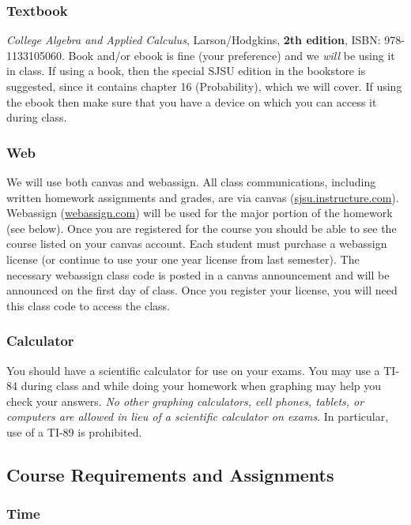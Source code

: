 \documentclass[letterpaper,12pt,fleqn]{article}
\begin{document}
\subsubsection*{Textbook}

\emph{College Algebra and Applied Calculus}, Larson/Hodgkins, \textbf{2th edition}, ISBN: 978-1133105060. Book
and/or ebook is fine (your preference) and we \emph{will} be using it in class.  If using a book, then the special
SJSU edition in the bookstore is suggested, since it contains chapter 16 (Probability), which we will cover.  If
using the ebook then make sure that you have a device on which you can access it during class.

\subsubsection*{Web}

We will use both canvas and webassign. All class communications, including written homework assignments and grades,
are via canvas (\url{sjsu.instructure.com}).  Webassign (\url{webassign.com}) will be used for the major portion of
the homework (see below).  Once you are registered for the course you should be able to see the course listed on
your canvas account.  Each student must purchase a webassign license (or continue to use your one year license from
last semester). The necessary webassign class code is posted in a canvas announcement and will be announced on the
first day of class. Once you register your license, you will need this class code to access the class.

\subsubsection*{Calculator}

You should have a scientific calculator for use on your exams.  You may use a TI-84 during class and while doing
your homework when graphing may help you check your answers.  \emph{No other graphing calculators, cell phones,
  tablets, or computers are allowed in lieu of a scientific calculator on exams}.  In particular, use of a TI-89 is
prohibited.

\subsection*{Course Requirements and Assignments}

\subsubsection*{Time}
\end{document}
